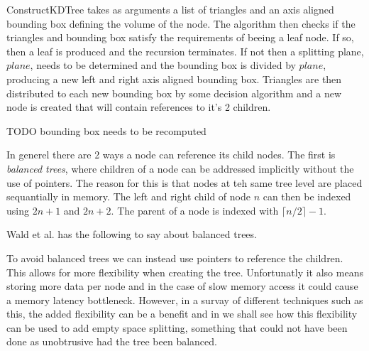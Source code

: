 ConstructKDTree takes as arguments a list of triangles and an axis
aligned bounding box defining the volume of the node. The algorithm
then checks if the triangles and bounding box satisfy the requirements
of beeing a leaf node. If so, then a leaf is produced and the
recursion terminates. If not then a splitting plane, $plane$, needs to
be determined and the bounding box is divided by $plane$, producing a
new left and right axis aligned bounding box. Triangles are then
distributed to each new bounding box by some decision algorithm and a
new node is created that will contain references to it's 2 children.

TODO bounding box needs to be recomputed


In generel there are 2 ways a node can reference its child nodes. The
first is \textit{balanced trees}, where children of a node can be
addressed implicitly without the use of pointers. The reason for this
is that nodes at teh same tree level are placed sequantially in
memory. The left and right child of node $n$ can then be indexed using
$2n+1$ and $2n+2$. The parent of a node is indexed with $\lceil n/2
\rceil - 1$.


Wald et al. has the following to say about
balanced trees.



To avoid balanced trees we can instead use pointers to reference the
children. This allows for more flexibility when creating the tree.
Unfortunatly it also means storing more data per node and in the case
of slow memory access it could cause a memory latency
bottleneck. However, in a survay of different techniques such as this,
the added flexibility can be a benefit and in
 we shall see how this flexibility can
be used to add empty space splitting, something that could not have
been done as unobtrusive had the tree been balanced.




